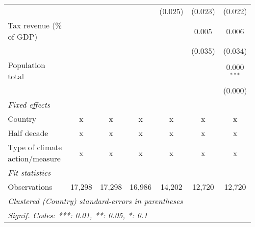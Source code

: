 \begin{tabular}{lcccccc}
                                                    &             &              &              & (0.025)       & (0.023)        & (0.022)\\   
   Tax revenue (\% of GDP)                          &             &              &              &               & 0.005          & 0.006\\   
                                                    &             &              &              &               & (0.035)        & (0.034)\\   
   Population total                                 &             &              &              &               &                & 0.000$^{***}$\\   
                                                    &             &              &              &               &                & (0.000)\\   
   \emph{Fixed effects}\\
   Country                                          & x           & x            & x            & x             & x              & x\\  
   Half decade                                      & x           & x            & x            & x             & x              & x\\  
   Type of climate action/measure                   & x           & x            & x            & x             & x              & x\\  
   \midrule \emph{Fit statistics}\\
   Observations                                     & 17,298      & 17,298       & 16,986       & 14,202        & 12,720         & 12,720\\  
   \midrule
   \multicolumn{7}{l}{\emph{Clustered (Country) standard-errors in parentheses}}\\
   \multicolumn{7}{l}{\emph{Signif. Codes: ***: 0.01, **: 0.05, *: 0.1}}\\
\end{tabular}
\par\endgroup


